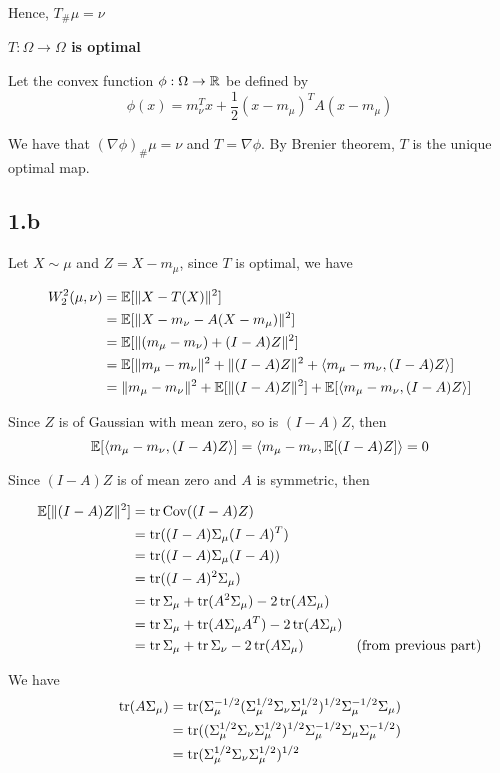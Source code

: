 Hence, $T_{\#} \mu = \nu$

\textbf{$T: \Omega \to \Omega$ is optimal}

Let the convex function $\phi: \Omega \to \mathbb{R}$ be defined by
$$
	\phi(x) = m_\nu^T x + \frac{1}{2} (x - m_\mu)^T A (x - m_\mu)
$$

We have that $(\nabla \phi)_{\#} \mu = \nu$ and $T = \nabla \phi$. By Brenier theorem, $T$ is the unique optimal map.



\subsection{1.b}

Let $X \sim \mu$ and $Z = X - m_\mu$, since $T$ is optimal, we have

\begin{align*}
	W_2^2 (\mu, \nu)
	&= \mathbb{E}[\lVert X - T(X)\rVert^2] \\
	&= \mathbb{E}[\lVert X - m_\nu - A(X - m_\mu)\rVert^2] \\
	&= \mathbb{E}[\lVert(m_\mu - m_\nu) + (I - A)Z\rVert^2] \\
	&= \mathbb{E} [\lVert m_\mu - m_\nu\rVert^2 + \lVert(I - A)Z\rVert^2 + \langle m_\mu - m_\nu, (I - A)Z\rangle] \\
	&= \lVert m_\mu - m_\nu\rVert^2 + \mathbb{E}[\lVert(I - A)Z\rVert^2] + \mathbb{E}[\langle m_\mu - m_\nu, (I - A)Z\rangle]
\end{align*}

Since $Z$ is of Gaussian with mean zero, so is $(I - A) Z$, then
$$
	\mathbb{E}[\langle m_\mu - m_\nu, (I - A)Z\rangle] = \langle m_\mu - m_\nu, \mathbb{E}[(I - A) Z]\rangle = 0
$$

Since $(I - A)Z$ is of mean zero and $A$ is symmetric, then

\begin{align*}
	\mathbb{E}[\lVert(I - A)Z\rVert^2] 
	&= \operatorname{tr} \operatorname{Cov}((I - A)Z) \\
	&= \operatorname{tr}((I-A) \Sigma_\mu (I-A)^T) \\
	&= \operatorname{tr}((I-A) \Sigma_\mu (I-A)) \\
	&= \operatorname{tr}((I-A)^2 \Sigma_\mu) \\
	&= \operatorname{tr} \Sigma_\mu + \operatorname{tr}(A^2 \Sigma_\mu) - 2 \operatorname{tr} (A\Sigma_\mu) \\
	&= \operatorname{tr} \Sigma_\mu + \operatorname{tr}(A \Sigma_\mu A^T) - 2 \operatorname{tr} (A\Sigma_\mu) \\
	&= \operatorname{tr} \Sigma_\mu + \operatorname{tr} \Sigma_\nu - 2 \operatorname{tr} (A\Sigma_\mu) &\text{(from previous part)}
\end{align*}

We have
\begin{align*}
	\operatorname{tr}(A \Sigma_\mu)
	&= \operatorname{tr} (\Sigma_\mu^{-1/2}(\Sigma_\mu^{1/2} \Sigma_\nu \Sigma_\mu^{1/2})^{1/2} \Sigma_\mu^{-1/2} \Sigma_\mu) \\
	&= \operatorname{tr} ((\Sigma_\mu^{1/2} \Sigma_\nu \Sigma_\mu^{1/2})^{1/2} \Sigma_\mu^{-1/2} \Sigma_\mu \Sigma_\mu^{-1/2}) \\
	&= \operatorname{tr} (\Sigma_\mu^{1/2} \Sigma_\nu \Sigma_\mu^{1/2})^{1/2}
\end{align*}

